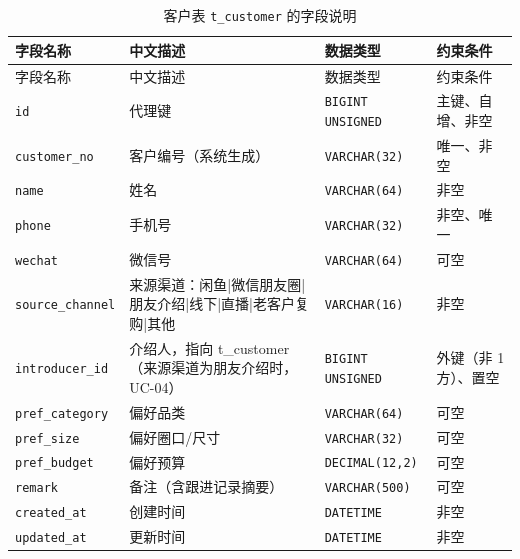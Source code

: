\documentclass[12pt, a4paper]{ctexart}
\newcommand{\code}[1]{\texttt{\small #1}}
\begin{document}
\begin{longtable}{@{}p{3.1cm} p{4.5cm} p{2.4cm} p{4.5cm}@{}}
\caption{客户表 \code{t\_customer} 的字段说明}\label{tab:f-t-customer}\\
\toprule
字段名称 & 中文描述 & 数据类型 & 约束条件 \\
\midrule
\endfirsthead
\toprule
字段名称 & 中文描述 & 数据类型 & 约束条件 \\
\midrule
\endhead
\bottomrule
\endlastfoot
\code{id} & 代理键 & \code{BIGINT UNSIGNED} & 主键、自增、非空 \\
\code{customer\_no} & 客户编号（系统生成） & \code{VARCHAR(32)} & 唯一、非空 \\
\code{name} & 姓名 & \code{VARCHAR(64)} & 非空 \\
\code{phone} & 手机号 & \code{VARCHAR(32)} & 非空、唯一 \\
\code{wechat} & 微信号 & \code{VARCHAR(64)} & 可空 \\
\code{source\_channel} & 来源渠道：闲鱼|微信朋友圈|朋友介绍|线下|直播|老客户复购|其他 & \code{VARCHAR(16)} & 非空 \\
\code{introducer\_id} & 介绍人，指向 t\_customer（来源渠道为朋友介绍时，UC-04） & \code{BIGINT UNSIGNED} & 外键（非 1 方）、置空 \\
\code{pref\_category} & 偏好品类 & \code{VARCHAR(64)} & 可空 \\
\code{pref\_size} & 偏好圈口/尺寸 & \code{VARCHAR(32)} & 可空 \\
\code{pref\_budget} & 偏好预算 & \code{DECIMAL(12,2)} & 可空 \\
\code{remark} & 备注（含跟进记录摘要） & \code{VARCHAR(500)} & 可空 \\
\code{created\_at} & 创建时间 & \code{DATETIME} & 非空 \\
\code{updated\_at} & 更新时间 & \code{DATETIME} & 非空 \\
\end{longtable}
\end{document}
